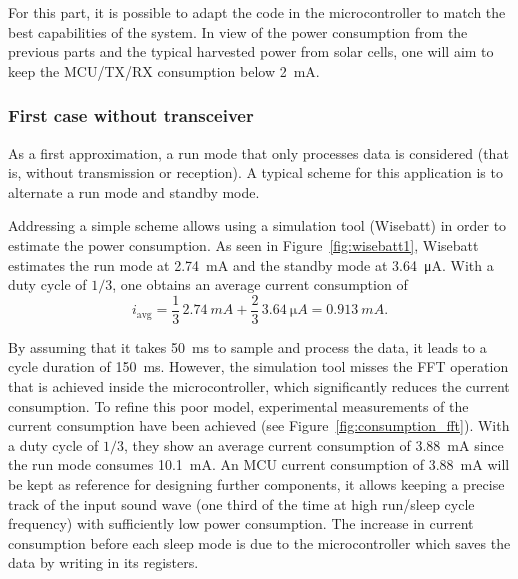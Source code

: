 \documentclass{EPL-master-thesis-covers-EN}
\newcommand{\te}[1]{\textrm{#1}}
\begin{document}

For this part, it is possible to adapt the code in the microcontroller to match the best capabilities of the system.
In view of the power consumption from the previous parts and the typical harvested power from solar cells, one will aim to keep the MCU/TX/RX consumption below \SI{2}{mA}. 

\subsubsection*{First case without transceiver}

As a first approximation, a run mode that only processes data is considered (that is, without transmission or reception). A typical scheme for this application is to alternate a run mode and standby mode.

Addressing a simple scheme allows using a simulation tool (Wisebatt) in order to estimate the power consumption. As seen in Figure~\ref{fig:wisebatt1}, Wisebatt estimates the run mode at \SI{2.74}{mA} and the standby mode at \SI{3.64}{\micro A}. With a duty cycle of $1/3$, one obtains an average current consumption of
\[
 i_\te{avg} = \frac{1}{3} \, \SI{2.74}{mA} + \frac{2}{3} \, \SI{3.64}{\micro A} = \SI{0.913}{mA}.
\]

By assuming that it takes \SI{50}{ms} to sample and process the data, it leads to a cycle duration of \SI{150}{ms}. However, the simulation tool misses the FFT operation that is achieved inside the microcontroller, which significantly reduces the current consumption. To refine this poor model, experimental measurements of the current consumption have been achieved (see Figure~\ref{fig:consumption_fft}). With a duty cycle of $1/3$, they show an average current consumption of \SI{3.88}{mA} since the run mode consumes \SI{10.1}{mA}. An MCU current consumption of \SI{3.88}{mA} will be kept as reference for designing further components, it allows keeping a precise track of the input sound wave (one third of the time at high run/sleep cycle frequency) with sufficiently low power consumption. The increase in current consumption before each sleep mode is due to the microcontroller which saves the data by writing in its registers.
\end{document}
